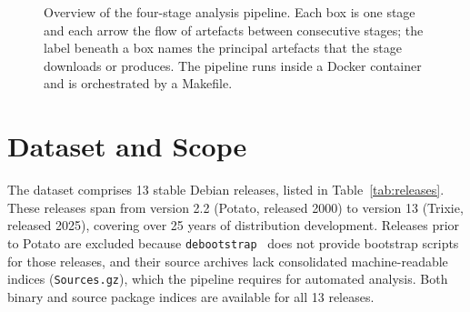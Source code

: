 \begin{figure}[ht]
  \centering
  \caption[Overview of the analysis pipeline.]{Overview of the four-stage analysis pipeline. Each box is one stage and each arrow the flow of artefacts between consecutive stages; the label beneath a box names the principal artefacts that the stage downloads or produces. The pipeline runs inside a Docker container and is orchestrated by a Makefile.}
  \label{fig:pipeline-overview}
\end{figure}

\section{Dataset and Scope}
\label{sec:dataset}

The dataset comprises 13 stable Debian releases, listed in Table~\ref{tab:releases}. These releases span from version 2.2 (Potato, released 2000) to version 13 (Trixie, released 2025), covering over 25 years of distribution development. Releases prior to Potato are excluded because \texttt{debootstrap}~\cite{debootstrap} does not provide bootstrap scripts for those releases, and their source archives lack consolidated machine-readable indices (\texttt{Sources.gz}), which the pipeline requires for automated analysis. Both binary and source package indices are available for all 13 releases.

